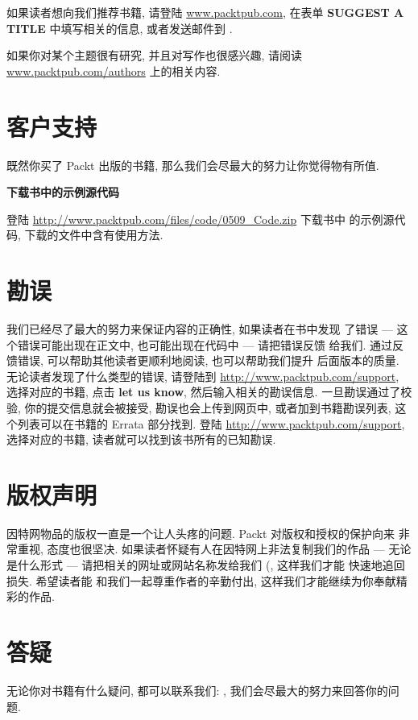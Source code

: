 如果读者想向我们推荐书籍, 请登陆 \url{www.packtpub.com}, 在表单 
\textbf{SUGGEST A TITLE} 中填写相关的信息, 或者发送邮件到 
.

如果你对某个主题很有研究, 并且对写作也很感兴趣, 请阅读
\url{www.packtpub.com/authors} 上的相关内容.

\section*{客户支持}
\label{sec:customer_support}
既然你买了 Packt 出版的书籍, 那么我们会尽最大的努力让你觉得物有所值.
\begin{warning}
    \textbf{下载书中的示例源代码}

    登陆 \url{http://www.packtpub.com/files/code/0509_Code.zip} 下载书中 
    的示例源代码, 下载的文件中含有使用方法.
\end{warning}

\section*{勘误}
\label{sec:errata}

我们已经尽了最大的努力来保证内容的正确性, 如果读者在书中发现
了错误 --- 这个错误可能出现在正文中, 也可能出现在代码中 --- 请把错误反馈
给我们. 通过反馈错误, 可以帮助其他读者更顺利地阅读, 也可以帮助我们提升
后面版本的质量. 无论读者发现了什么类型的错误, 请登陆到
\url{http://www.packtpub.com/support}, 选择对应的书籍, 点击 \textbf{let us
know}, 然后输入相关的勘误信息. 一旦勘误通过了校验, 你的提交信息就会被接受, 
勘误也会上传到网页中, 或者加到书籍勘误列表, 这个列表可以在书籍的 Errata 
部分找到. 登陆 \url{http://www.packtpub.com/support}, 选择对应的书籍,
读者就可以找到该书所有的已知勘误.

\section*{版权声明}
\label{sec:piracy}

因特网物品的版权一直是一个让人头疼的问题. Packt 对版权和授权的保护向来
非常重视, 态度也很坚决. 如果读者怀疑有人在因特网上非法复制我们的作品 ---
无论是什么形式 --- 请把相关的网址或网站名称发给我们
(, 这样我们才能 快速地追回损失. 希望读者能
和我们一起尊重作者的辛勤付出, 这样我们才能继续为你奉献精彩的作品.

\section*{答疑}
\label{sec:questions}
无论你对书籍有什么疑问, 都可以联系我们: ,
我们会尽最大的努力来回答你的问题.
